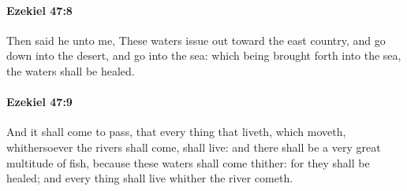		\paragraph{Ezekiel 47:8} %
			\label{EZEKIEL-47-8}

			Then said he unto me, These waters issue out toward the east country, and go down into the desert, and go into the sea: which being brought forth into the sea, the waters shall be healed.


		\paragraph{Ezekiel 47:9} %
			\label{EZEKIEL-47-9}

			And it shall come to pass, that every thing that liveth, which moveth, whithersoever the rivers shall come, shall live: and there shall be a very great multitude of fish, because these waters shall come thither: for they shall be healed; and every thing shall live whither the river cometh.

